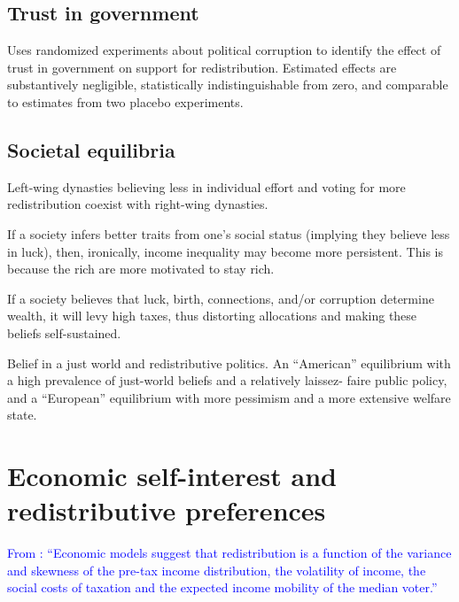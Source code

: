 \documentclass{article}
\newcommand{\blue}[1]{\textcolor{blue}{#1}}
\newcommand{\citem}[1]{\medskip \noindent \textbf{\cite*{#1}}}
\begin{document}
\subsection{Trust in government}

\citem{peyton2020does}

Uses randomized experiments about political corruption to identify the effect of trust in government on support for redistribution. Estimated effects are substantively negligible, statistically indistinguishable from zero, and comparable to estimates from two placebo experiments.

\subsection{Societal equilibria}

\citem{piketty1995social}

Left-wing dynasties believing less in individual effort and voting for more
redistribution coexist with right-wing dynasties. 

\citem{piketty1998self}

If a society infers better traits from one’s social status (implying they believe less in luck), then, ironically, income inequality may become more persistent. This is because the rich are more motivated to stay rich.

\citem{alesina2005fairness}

If a society believes that luck, birth, connections, and/or corruption determine wealth, it will levy high taxes, thus distorting allocations and making these beliefs self-sustained.

\citem{benabou2006belief}

Belief in a just world and redistributive politics. An “American” equilibrium with a high prevalence of just-world beliefs and a relatively laissez- faire public policy, and a “European” equilibrium with more pessimism and a more extensive welfare state.





\section{Economic self-interest and redistributive preferences}

\blue{From \cite{alesina2001doesn}: ``Economic models suggest that redistribution is a function of the variance and skewness of the pre-tax income distribution, the volatility of income, the social costs of taxation and the expected income mobility of the median voter.''}
\end{document}

